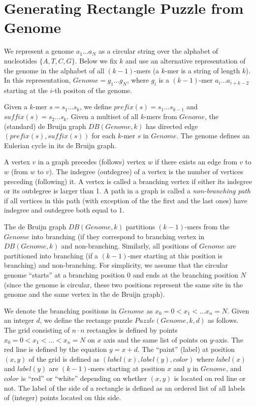 \documentclass[a4paper]{article}
\begin{document}
\section{Generating Rectangle Puzzle from Genome}


We represent a genome $a_1 \ldots a_N$ as a circular string over the alphabet of nucleotides $\{A,T,C,G\}$. 
Below we fix $k$ and use an alternative representation of the genome in the alphabet of all $(k-1)$-mers (a $k$-mer is a string of length $k$). In this representation,  $Genome=g_1 \ldots g_N$, where $g_i$ is a $(k-1)$-mer $a_i \ldots a_{i+k-2}$ starting at the $i$-th positon of the genome.  


Given a $k$-mer $s = s_1\ldots s_k$,
we define $prefix(s)= s_1\ldots s_{k-1}$ and $suffix(s) = s_2\ldots s_k$. Given a multiset of all $k$-mers  from $Genome$, 
the (standard) de Bruijn graph $DB(Genome,k)$ has directed edge $(prefix(s),suffix(s))$
for each $k$-mer $s$ in $Genome$.  The genome defines an Eulerian cycle in its de Bruijn graph. 

A vertex $v$  in a graph precedes (follows) vertex $w$ if there exists an edge from $v$ to $w$ (from $w$ to $v$). The indegree (outdegree)  of a vertex 
is the number of vertices preceding (following) it.  A vertex is called a branching vertex if either its indegree or its outdegree is larger than 1. A path in a graph is called a {\em non-branching path}  if all vertices in this path (with exception of the the first and the last ones) have indegree and outdegree
both equal to 1. 

The de Bruijn graph $DB(Genome,k)$ partitions $(k-1)$-mers from the $Genome$ into branching (if they correspond to branching vertex in $DB(Genome,k)$ and non-branching. Similarly, all 
positions of $Genome$ are partitioned into branching (if a $(k-1)$-mer  starting at this position is branching) and non-branching. For simplicity, we assume that the circular genome ``starts'' at a branching position 0 and ends at the branching position $N$ (since the genome is circular, these two positions represent the same site in the genome and the same vertex in the de Bruijn graph).  

We denote the branching positions in $Genome$ as $x_0=0 < x_1 < \ldots x_n=N$.  
Given an integer $d$, we define the rectange puzzle $Puzzle(Genome,k,d)$ as follows. The grid consisting of $n \cdot n$ rectangles is defined by points $x_0=0 < x_1 < \ldots <x_n=N$ on $x$ axis and the same list of points on $y$-axis. The red line is defined by the equation $y=x+d$.  The ``paint'' (label) at position $(x,y)$ of the grid is defined as $(label(x),label(y),color)$ where $label(x)$ and  $label(y)$ are 
$(k-1)$-mers starting at position $x$ and $y$ in $Genome$, and $color$  
is ``red'' or ``white'' depending on whether $(x,y)$ is located on red line or not. 
The label of the side of a rectangle is defined as an ordered list of all labels of (integer) points located on this side. 
\end{document}
